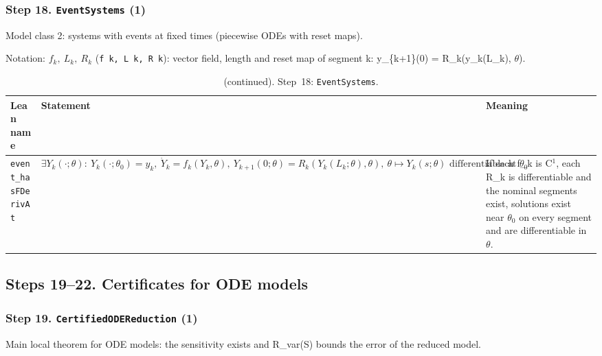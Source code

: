 \subsubsection*{Step 18. \texttt{EventSystems} (1)}
Model class 2: systems with events at fixed times (piecewise ODEs with reset maps).

{\small\raggedright Notation: $f_k,\ L_k,\ R_k$ (\texttt{f k, L k, R k}): vector field, length and reset map of segment k: y\_\{k+1\}(0) = R\_k(y\_k(L\_k), $\theta$).}

\addtocounter{table}{-1}
{\small
\begin{longtable}{@{}>{\raggedright\arraybackslash}p{3.6cm}>{\raggedright\arraybackslash}p{6.6cm}>{\raggedright\arraybackslash}p{5.6cm}@{}}
\caption[]{(continued). Step~18: \texttt{EventSystems}.}\\
\toprule
Lean name & Statement & Meaning \\
\midrule
\endhead
\texttt{event\_\allowbreak{}hasFDerivAt} & $\displaystyle \exists Y_k(\cdot;\theta):\ Y_k(\cdot;\theta_0)=y_k,\ \dot Y_k=f_k(Y_k,\theta),\ Y_{k+1}(0;\theta)=R_k(Y_k(L_k;\theta),\theta),\ \theta\mapsto Y_k(s;\theta)\text{ differentiable at }\theta_0$ & If each f\_k is C$^1$, each R\_k is differentiable and the nominal segments exist, solutions exist near $\theta_0$ on every segment and are differentiable in $\theta$. \\[3pt]
\bottomrule
\end{longtable}
}

\subsection*{Steps 19--22. Certificates for ODE models}

\subsubsection*{Step 19. \texttt{CertifiedODEReduction} (1)}
Main local theorem for ODE models: the sensitivity exists and R\_var(S) bounds the error of the reduced model.

